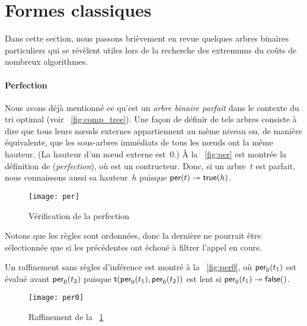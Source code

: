 \clearpage

\section{Formes classiques}

Dans cette section, nous passons brièvement en revue quelques arbres
binaires particuliers qui se révèlent utiles lors de la recherche des
extremums du coûts de nombreux algorithmes.

\paragraph{Perfection}
\label{par:perfection}

 Nous avons déjà mentionné ce
qu'est un \emph{arbre binaire parfait} dans le contexte du tri optimal
(voir \fig~\vref{fig:comp_tree}). Une façon de définir de tels arbres
consiste à dire que tous leurs n{\oe}uds externes appartiennent au
même niveau ou, de manière équivalente, que les sous-arbres immédiats
de tous les n{\oe}uds ont la même hauteur. (La
hauteur d'un n{\oe}ud externe est~\(0\).) À la \fig~\vref{fig:per} est
montrée la définition de 
(\emph{perfection}), où  est un contructeur. Donc, si un
arbre~\(t\) est parfait, nous connaissons aussi sa hauteur~\(h\)
puisque \(\textsf{per}(t) \twoheadrightarrow \textsf{true}(h)\).

\bigskip

\begin{figure}[h]
\centering
\texttt{[image: per]}
\caption{Vérification de la perfection\label{fig:per}}
\end{figure}

\smallskip

\noindent Notons que les règles sont ordonnées, donc la dernière ne
pourrait être sélectionnée que si les précédentes ont échoué à filtrer
l'appel en cours.

Un raffinement sans règles d'inférence est montré à la
\fig~\vref{fig:per0}, où \(\textsf{per}_0(t_1)\) est évalué avant
\(\textsf{per}_0(t_2)\) puisque
\(\textsf{t}(\textsf{per}_0(t_1), \textsf{per}_0(t_2))\) est lent si
\(\textsf{per}_0(t_1) \twoheadrightarrow \textsf{false}()\).

\bigskip

\begin{figure}[h]
\centering
\texttt{[image: per0]}
\caption{Raffinement de la \fig~\ref{fig:per}\label{fig:per0}}
\end{figure}


